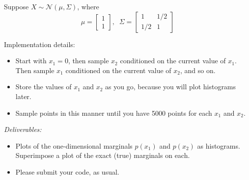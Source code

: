\documentclass{abernethy_hw}
\begin{document}
Suppose $X \sim \mathcal{N}(\mu, \Sigma)$, where 
\[
\mu = \left[ \begin{array}{c}
     1  \\
     1
\end{array} \right], \;\; \Sigma= \left[ \begin{array}{cc}
    1 & 1/2 \\
    1/2 & 1
\end{array} \right]
\]



Implementation details:
\begin{itemize}
    \setlength{\leftskip}{\probmargin}
	\addtolength{\leftskip}{\probmargin}
	\item Start with $x_1 = 0$, then sample $x_2$ conditioned on the current value of $x_1$. Then sample $x_1$ conditioned on the current value of $x_2$, and so on.
	\item Store the values of $x_1$ and $x_2$ as you go, because you will plot histograms later.
    \item Sample points in this manner until you have 5000 points for each $x_1$ and $x_2$.
\end{itemize}

\emph{Deliverables:}
\begin{itemize}
    \setlength{\leftskip}{\probmargin}
	\addtolength{\leftskip}{\probmargin}
    \item Plots of the one-dimensional marginals $p(x_1)$ and $p(x_2)$ as histograms.  Superimpose a plot of the exact (true) marginals on each.
    \item Please submit your code, as usual.
\end{itemize}
\end{document}

